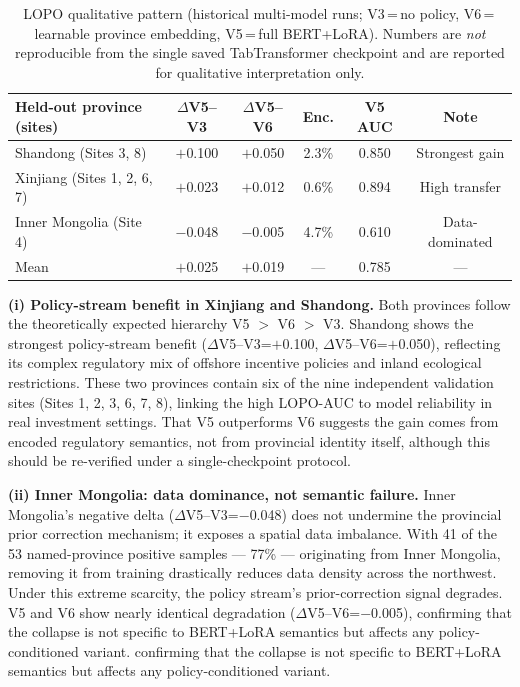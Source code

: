 \documentclass[12pt, a4paper]{article}
\begin{document}
\begin{table}[H]
\centering
\caption{LOPO qualitative pattern (historical multi-model
runs; V3\,=\,no policy, V6\,=\,learnable province embedding,
V5\,=\,full BERT+LoRA). Numbers are \textit{not}
reproducible from the single saved TabTransformer
checkpoint and are reported for qualitative interpretation
only.}
\label{tab:lopo}
\small
\begin{tabular}{lccccc}
\toprule
\textbf{Held-out province (sites)} &
\textbf{$\Delta$V5--V3} & \textbf{$\Delta$V5--V6} &
\textbf{Enc.} & \textbf{V5 AUC} & \textbf{Note} \\
\midrule
Shandong (Sites 3, 8)         & $+$0.100 & $+$0.050 & 2.3\% & 0.850 & Strongest gain \\
Xinjiang (Sites 1, 2, 6, 7)   & $+$0.023 & $+$0.012 & 0.6\% & 0.894 & High transfer \\
Inner Mongolia (Site 4)        & $-$0.048 & $-$0.005 & 4.7\% & 0.610 & Data-dominated \\
\midrule
Mean                           & $+$0.025 & $+$0.019 & ---   & 0.785 & --- \\
\bottomrule
\end{tabular}
\end{table}

\textbf{(i) Policy-stream benefit in Xinjiang and Shandong.}
Both provinces follow the theoretically expected hierarchy
V5 $>$ V6 $>$ V3. Shandong shows the strongest
policy-stream benefit ($\Delta$V5--V3=$+$0.100,
$\Delta$V5--V6=$+$0.050), reflecting its complex
regulatory mix of offshore incentive policies and inland
ecological restrictions. These two provinces contain six
of the nine independent validation sites (Sites 1, 2, 3,
6, 7, 8), linking the high LOPO-AUC to model reliability
in real investment settings. That V5 outperforms V6
suggests the gain comes from encoded regulatory semantics,
not from provincial identity itself, although this should
be re-verified under a single-checkpoint protocol.

\textbf{(ii) Inner Mongolia: data dominance, not semantic failure.}
Inner Mongolia's negative delta ($\Delta$V5--V3=$-$0.048)
does not undermine the provincial prior correction
mechanism; it exposes a spatial data imbalance. With 41 of
the 53 named-province positive samples --- 77\% ---
originating from Inner Mongolia, removing it from training
drastically reduces data density across the northwest.
Under this extreme scarcity, the policy stream's
prior-correction signal degrades. V5 and V6 show nearly
identical degradation ($\Delta$V5--V6=$-$0.005),
confirming that the collapse is not specific to
BERT+LoRA semantics but affects any policy-conditioned
variant.
confirming that the collapse is not specific to
BERT+LoRA semantics but affects any policy-conditioned
variant.
\end{document}
